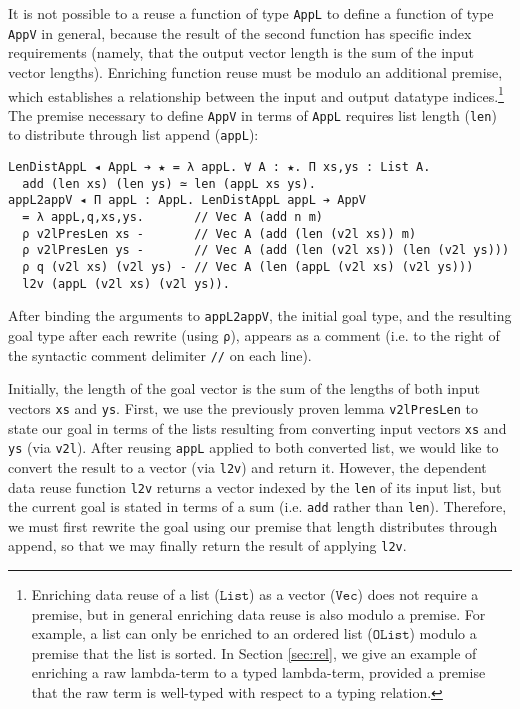 \documentclass[acmsmall,screen]{acmart}
\newcommand{\refsec}[1]{Section \ref{sec:#1}}
\newcommand{\txt}[1]{\ensuremath{\texttt{#1}}}
\begin{document}
It is not possible to a reuse a function of type \verb;AppL; to define
a function of type \verb;AppV; in general, because the result of the second function
has specific index requirements (namely, that the output vector
length is the sum of the input vector lengths). Enriching
function reuse must be modulo an additional premise, which establishes
a relationship between the input and output datatype
indices.\footnote{
  Enriching data reuse of a list (\txt{List}) as a vector (\txt{Vec})
  does not require a premise, but in general enriching data reuse is
  also modulo a premise. For example, a list can only be enriched to
  an ordered list (\txt{OList}) modulo a premise that the list is
  sorted. In \refsec{rel}, we give an example of enriching a raw
  lambda-term to a typed lambda-term, provided a premise that the raw
  term is well-typed with respect to a typing relation.
  }
The premise necessary to define \verb;AppV; in terms of \verb;AppL; requires
list length (\verb;len;) to distribute through list append (\verb;appL;):
\begin{verbatim}
LenDistAppL ◂ AppL ➔ ★ = λ appL. ∀ A : ★. Π xs,ys : List A.
  add (len xs) (len ys) ≃ len (appL xs ys).
appL2appV ◂ Π appL : AppL. LenDistAppL appL ➔ AppV
  = λ appL,q,xs,ys.       // Vec A (add n m)            
  ρ v2lPresLen xs -       // Vec A (add (len (v2l xs)) m)
  ρ v2lPresLen ys -       // Vec A (add (len (v2l xs)) (len (v2l ys)))
  ρ q (v2l xs) (v2l ys) - // Vec A (len (appL (v2l xs) (v2l ys)))
  l2v (appL (v2l xs) (v2l ys)).
\end{verbatim}
After binding the arguments to \verb;appL2appV;,
the initial goal type, and the resulting goal type after each
rewrite (using \verb;ρ;), appears as a comment
(i.e. to the right of the syntactic comment delimiter \verb;//; on each line).

Initially, the length of the goal vector is the sum of the lengths of
both input vectors \verb;xs; and \verb;ys;. First, we use the
previously proven lemma \verb;v2lPresLen; to state our goal in terms
of the lists resulting from converting input vectors \verb;xs; and
\verb;ys; (via \verb;v2l;). After reusing \verb;appL; applied to both
converted list, we would like to convert the result to a vector (via
\verb;l2v;) and return it. However, the dependent data reuse function
\verb;l2v; returns a vector indexed by the \verb;len; of its input
list, but the current goal is stated in terms of a sum
(i.e. \verb;add; rather than \verb;len;). Therefore, we must first
rewrite the goal using our premise that length distributes through
append, so that we may finally return the result of applying
\verb;l2v;.
\end{document}
